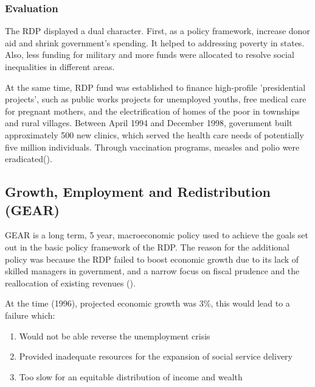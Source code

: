 \documentclass{elsarticle}
\begin{document}
\subsubsection{Evaluation}
The RDP displayed a dual character. First, as a policy framework, increase donor aid and shrink government's spending. It helped to addressing poverty in states. Also, less funding for military and more funds were allocated to resolve social inequalities in different areas. 

At the same time, RDP fund was established to finance high-profile 'presidential projects', such as public works projects for unemployed youths, free medical care for pregnant mothers, and the electrification of homes of the poor in townships and rural villages. Between April 1994 and December 1998, government built approximately 500 new clinics, which served the health care needs of potentially five million individuals. Through vaccination programs, measles and polio were eradicated(\cite{Besada2007}).

\subsection{Growth, Employment and Redistribution (GEAR)}
GEAR is a long term, 5 year, macroeconomic policy used to achieve the goals set out in the basic policy framework of the RDP. The reason for the additional policy was because the RDP failed to boost economic growth due to its lack of skilled managers in government, and a narrow focus on fiscal prudence and the reallocation of existing revenues (\cite{SAHO2014}). 

At the time (1996), projected economic growth was 3\%, this would lead to a failure which:
\begin{enumerate}
    \item Would not be able reverse the unemployment crisis
    \item Provided inadequate resources for the expansion of social service delivery
    \item Too slow for an equitable distribution of income and wealth
\end{enumerate}
\end{document}
